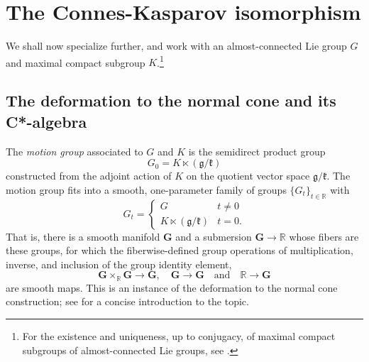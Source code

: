 \documentclass[leqno,11pt]{amsart}
\numberwithin{equation}{subsection}
\theoremstyle{plain}
\theoremstyle{definition}
\theoremstyle{remark}
\newcommand{\R}{\mathbb{R}}
\newcommand{\GG}{\pmb{G}}
\begin{document}
\section{The Connes-Kasparov isomorphism}

We shall now specialize further,  and work with an almost-connected Lie group $G$ and maximal compact subgroup $K$.\footnote{For the existence and uniqueness, up to conjugacy, of maximal compact subgroups of almost-connected Lie groups, see \cite[Thm.\,XV.3.1]{HochschildStructureOfLieGroups}.}

\subsection{The deformation to the normal cone and its C*-algebra} 
The \emph{motion group} associated to $G$ and $K$ is the semidirect product group 
\[
G_0 = K \ltimes ( \mathfrak{g}/\mathfrak{k} )
\]
constructed from the adjoint action of $K$ on the quotient vector space $\mathfrak{g}/\mathfrak{k}$. The  motion group fits into a smooth, one-parameter family of groups $\{ G_t \} _{t\in \R}$ with 
\[
G_t = 
\begin{cases} 
G & t\ne 0 \\
K \ltimes ( \mathfrak{g}/\mathfrak{k} ) & t=0.
\end{cases}
\]
That is, there is a smooth manifold $\GG $ and a submersion  $\GG\to \R$ whose fibers are these groups, for which the fiberwise-defined group operations of multiplication, inverse, and inclusion of the group identity element,
\[
\GG  \times _{\R} \GG  
\longrightarrow \GG , 
\quad 
\GG  
\longrightarrow \GG 
\quad \text{and}\quad 
\mathbb{\R} 
\longrightarrow \GG 
\]
are smooth maps. This is an instance of the deformation to the normal cone construction; see \cite[Sec.\,2.4]{DebordSkandalis19} for a concise introduction to the topic.  
\end{document}
